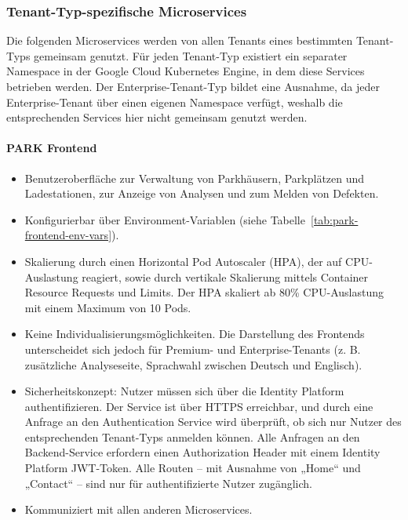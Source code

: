 \subsubsection{Tenant-Typ-spezifische Microservices}
Die folgenden Microservices werden von allen Tenants eines bestimmten Tenant-Typs gemeinsam genutzt. Für jeden Tenant-Typ existiert ein separater Namespace in der Google Cloud Kubernetes Engine, in dem diese Services betrieben werden. Der Enterprise-Tenant-Typ bildet eine Ausnahme, da jeder Enterprise-Tenant über einen eigenen Namespace verfügt, weshalb die entsprechenden Services hier nicht gemeinsam genutzt werden.

\paragraph{PARK Frontend}
\begin{itemize}
	\item Benutzeroberfläche zur Verwaltung von Parkhäusern, Parkplätzen und Ladestationen, zur Anzeige von Analysen und zum Melden von Defekten.
	\item Konfigurierbar über Environment-Variablen (siehe Tabelle~\ref{tab:park-frontend-env-vars}).
	\item Skalierung durch einen Horizontal Pod Autoscaler (HPA), der auf CPU-Auslastung reagiert, sowie durch vertikale Skalierung mittels Container Resource Requests und Limits. Der HPA skaliert ab 80\% CPU-Auslastung mit einem Maximum von 10 Pods.
	\item Keine Individualisierungsmöglichkeiten. Die Darstellung des Frontends unterscheidet sich jedoch für Premium- und Enterprise-Tenants (z. B. zusätzliche Analyseseite, Sprachwahl zwischen Deutsch und Englisch).
	\item Sicherheitskonzept: Nutzer müssen sich über die Identity Platform authentifizieren. Der Service ist über HTTPS erreichbar, und durch eine Anfrage an den Authentication Service wird überprüft, ob sich nur Nutzer des entsprechenden Tenant-Typs anmelden können. Alle Anfragen an den Backend-Service erfordern einen Authorization Header mit einem Identity Platform JWT-Token. Alle Routen -- mit Ausnahme von „Home“ und „Contact“ -- sind nur für authentifizierte Nutzer zugänglich.
	\item Kommuniziert mit allen anderen Microservices.
\end{itemize}

